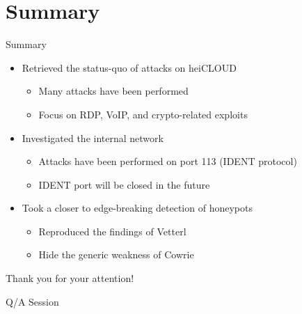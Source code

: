 
\section{Summary}

\begin{frame}{Summary}
    \begin{itemize}
        \item Retrieved the status-quo of attacks on heiCLOUD
        \begin{itemize}
            \item Many attacks have been performed
            \item Focus on RDP, VoIP, and crypto-related exploits
        \end{itemize}
        \item Investigated the internal network
        \begin{itemize}
            \item Attacks have been performed on port 113 (IDENT protocol)
            \item IDENT port will be closed in the future
        \end{itemize}
        \item Took a closer to edge-breaking detection of honeypots
        \begin{itemize}
            \item Reproduced the findings of Vetterl
            \item Hide the generic weakness of Cowrie
        \end{itemize}
    \end{itemize}
\end{frame}

\begin{frame}{}
    \begin{center}
        Thank you for your attention!
    \end{center}
    \begin{center}
        Q/A Session
    \end{center}
\end{frame}
